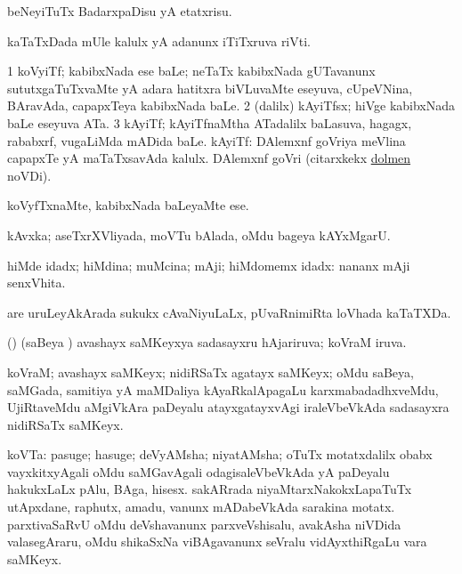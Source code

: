 \bentry
{}
\gl{\sakirx}
\expl{}
\bmng
beNeyiTuTx BadarxpaDisu yA etatxrisu. 
\emng
\eentry

\bentry
{}
\gl{\nA}
\bmng
kaTaTxDada mUle kalulx yA adanunx iTiTxruva riVti. 
\emng
\eentry

\bentry
{}
\gl{\nA}
\bmng
\bnum
\num{1} koVyiTf; kabibxNada ese baLe; neTaTx kabibxNada gUTavanunx sututxgaTuTxvaMte yA adara hatitxra biVLuvaMte eseyuva, cUpeVNina, BAravAda, capapxTeya kabibxNada baLe. 
\num{2} (\bava dalilx) kAyiTfsx; hiVge kabibxNada baLe eseyuva ATa. 
\num{3} kAyiTf; kAyiTfnaMtha ATadalilx baLasuva, hagagx, rababxrf, \mo vugaLiMda mADida baLe. 
 kAyiTf: 
\banum
{} DAlemxnf goVriya meVlina capapxTe yA maTaTxsavAda kalulx. 
 DAlemxnf goVri (citarxkekx \hyperref{kandict_d.pdf}{D}{dolmen}{dolmen} noVDi). 
\eanum
\numie
\enum
\emng
\eentry

\bentry
{}
\gl{\sakirx}
\bmng
koVyfTxnaMte, kabibxNada baLeyaMte ese. 
\emng
\eentry

\bentry
{}
\gl{\nA}
\bmng
kAvxka; aseTxrXVliyada, moVTu bAlada, oMdu bageya kAYxMgarU. 
\emng
\eentry

\bentry
{}
\gl{\gu}
\bmng
hiMde idadx; hiMdina; muMcina; mAji; hiMdomemx idadx:  nananx mAji senxVhita. 
\emng
\eentry

\bentry
{}
\gl{\nA}
\expl{(\ame) \P\ }
\bmng
are uruLeyAkArada sukukx cAvaNiyuLaLx, pUvaRnimiRta loVhada kaTaTXDa. 
\emng
\eentry

\bentry
{}
\gl{\gu}
\bmng
(\birx) (saBeya \vi) avashayx saMKeyxya sadasayxru hAjariruva; koVraM iruva. 
\emng
\eentry

\bentry
{}
\gl{\nA}
\bmng
koVraM; avashayx saMKeyx; nidiRSaTx agatayx saMKeyx; oMdu saBeya, saMGada, samitiya yA maMDaliya kAyaRkalApagaLu karxmabadadhxveMdu, UjiRtaveMdu aMgiVkAra paDeyalu atayxgatayxvAgi iraleVbeVkAda sadasayxra nidiRSaTx saMKeyx. 
\emng
\eentry

\bentry
{}
\gl{\nA}
\expl{}
\bmng
koVTa: 
\banum
{} pasuge; hasuge; deVyAMsha; niyatAMsha; oTuTx motatxdalilx obabx vayxkitxyAgali oMdu saMGavAgali odagisaleVbeVkAda yA paDeyalu hakukxLaLx pAlu, BAga, hisesx. 
 sakARrada niyaMtarxNakokxLapaTuTx utApxdane, raphutx, amadu, \mo vanunx mADabeVkAda sarakina motatx. 
 parxtivaSaRvU oMdu deVshavanunx parxveVshisalu, avakAsha niVDida valasegAraru, oMdu shikaSxNa viBAgavanunx seVralu vidAyxthiRgaLu \mo vara saMKeyx. 
\eanum
\emng
\eentry

